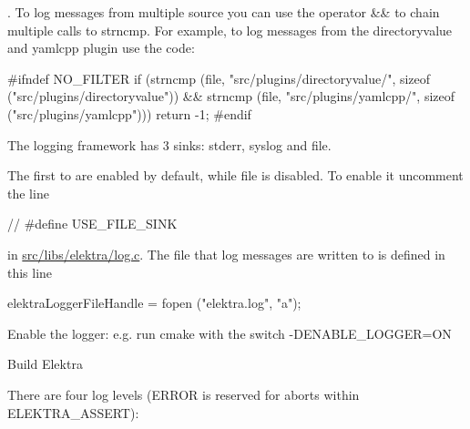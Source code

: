 . To log messages from multiple source you can use the operator {\ttfamily \&\&} to chain multiple calls to {\ttfamily strncmp}. For example, to log messages from the {\ttfamily directoryvalue} and {\ttfamily yamlcpp} plugin use the code\+:


\begin{DoxyCode}
\textcolor{preprocessor}{#ifndef NO\_FILTER}
     \textcolor{keywordflow}{if} (strncmp (file, \textcolor{stringliteral}{"src/plugins/directoryvalue/"}, \textcolor{keyword}{sizeof} (\textcolor{stringliteral}{"src/plugins/directoryvalue"})) &&
         strncmp (file, \textcolor{stringliteral}{"src/plugins/yamlcpp/"}, \textcolor{keyword}{sizeof} (\textcolor{stringliteral}{"src/plugins/yamlcpp"})))
             \textcolor{keywordflow}{return} -1;
\textcolor{preprocessor}{#endif}
\end{DoxyCode}


The logging framework has 3 sinks\+: stderr, syslog and file.

The first to are enabled by default, while file is disabled. To enable it uncomment the line


\begin{DoxyCode}
\textcolor{comment}{// #define USE\_FILE\_SINK}
\end{DoxyCode}


in {\ttfamily \hyperlink{log_8c}{src/libs/elektra/log.\+c}}. The file that log messages are written to is defined in this line


\begin{DoxyCode}
elektraLoggerFileHandle = fopen (\textcolor{stringliteral}{"elektra.log"}, \textcolor{stringliteral}{"a"});
\end{DoxyCode}



\begin{DoxyEnumerate}
\item Enable the logger\+: e.\+g. run {\ttfamily cmake} with the switch {\ttfamily -\/\+D\+E\+N\+A\+B\+L\+E\+\_\+\+L\+O\+G\+G\+ER=ON}
\item Build Elektra
\end{DoxyEnumerate}

There are four log levels (E\+R\+R\+OR is reserved for aborts within {\ttfamily E\+L\+E\+K\+T\+R\+A\+\_\+\+A\+S\+S\+E\+RT})\+:


